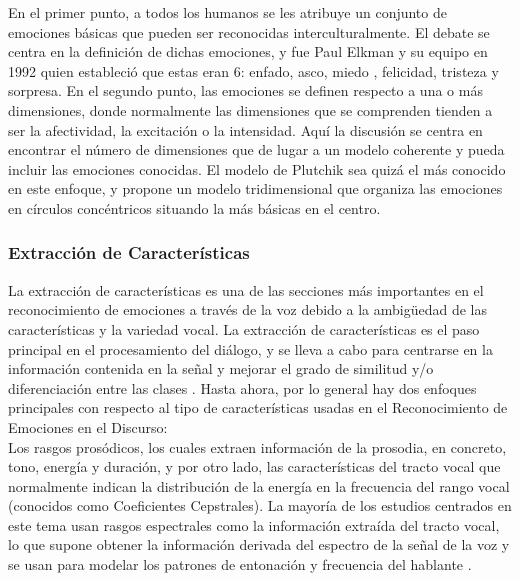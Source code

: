 \documentclass[11pt,a4paper,spanish]{book}
\begin{document}
	En el primer punto, a todos los humanos se les atribuye un conjunto de emociones básicas que pueden ser reconocidas interculturalmente. El debate se centra en la definición de dichas emociones, y fue Paul Elkman y su equipo en 1992 \cite{Ekman1992} quien estableció que estas eran 6: enfado, asco, miedo , felicidad, tristeza y sorpresa.
	En el segundo punto, las emociones se definen respecto a una o más dimensiones, donde normalmente las dimensiones que se comprenden tienden a ser la afectividad, la excitación o la intensidad. Aquí la discusión se centra en encontrar el número de dimensiones que de lugar a un modelo coherente y pueda incluir las emociones conocidas. El modelo de Plutchik \cite{Plutchik2001} sea quizá el más conocido en este enfoque, y propone un modelo tridimensional que organiza las emociones en círculos concéntricos situando la más básicas en el centro. \hfill \break

	\subsubsection{Extracción de Características}
	La extracción de características es una de las secciones más importantes en el reconocimiento de emociones a través de la voz debido a la ambigüedad de las características y la variedad vocal. La extracción de características es el paso principal en el procesamiento del diálogo, y se lleva a cabo para centrarse en la información contenida en la señal y mejorar el grado de similitud y/o diferenciación entre las clases \cite{Hellbernd2016}. Hasta ahora, por lo general hay dos enfoques principales  con respecto al tipo de características usadas en el Reconocimiento de Emociones en el Discurso:\\
	Los rasgos prosódicos, los cuales extraen información de la prosodia, en concreto, tono, energía y duración, y por otro lado, las características del tracto vocal que normalmente indican la distribución de la energía en la frecuencia del rango vocal (conocidos como Coeficientes Cepstrales).
	La mayoría de los estudios centrados en este tema usan rasgos espectrales como la información extraída del tracto vocal, lo que supone obtener la información derivada del espectro de la señal de la voz y se usan para modelar los patrones de entonación y frecuencia del hablante \cite{Langari2020}.\\
	

	
\end{document}
